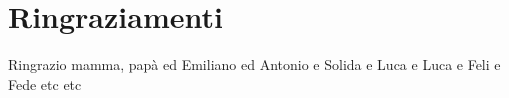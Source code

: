 \section*{Ringraziamenti}
Ringrazio mamma, papà ed Emiliano ed Antonio e Solida e Luca e Luca e Feli e Fede etc etc